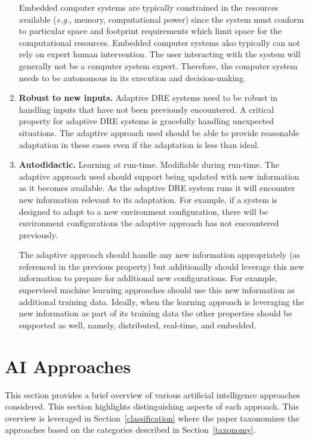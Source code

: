 \documentclass[conference]{IEEEtran}
\begin{document}
\begin{enumerate}
Embedded computer systems are typically constrained in the resources available (\emph{e.g.}, memory, computational power) since the system must conform to particular space and footprint requirements which limit space for the computational resources. Embedded computer systems also typically can not rely on expert human intervention. The user interacting with the system will generally not be a computer system expert. Therefore, the computer system needs to be autonomous in its execution and decision-making.

\item \textbf{Robust to new inputs.} Adaptive DRE systems need to be robust in handling inputs that have not been previously encountered. A critical property for adaptive DRE systems is gracefully handling unexpected situations. The adaptive approach used should be able to provide reasonable adaptation in these cases even if the adaptation is less than ideal.

\item \textbf{Autodidactic.} Learning at run-time. Modifiable during run-time. The adaptive approach used should support being updated with new information as it becomes available. As the adaptive DRE system runs
it will encounter new information relevant to its adaptation. For example, if a system
is designed to adapt to a new environment configuration, there will be environment
configurations the adaptive approach has not encountered previously.

The adaptive approach should handle any new information appropriately (as referenced in the previous property) but additionally should
leverage this new information to prepare for additional new configurations. For example, supervised
machine learning approaches should use this new information as additional training data.
Ideally, when the learning approach is leveraging the new information as part of its training data the other properties should be supported as well, namely, distributed, real-time, and embedded.

\end{enumerate}

\section{AI Approaches}
\label{ml-approaches}

This section provides a brief overview of various artificial intelligence approaches considered. This section highlights distinguishing aspects of each approach.
This overview is leveraged in Section~\ref{classification} where the paper
taxonomizes the approaches based on the categories described in
Section~\ref{taxonomy}.
\end{document}
